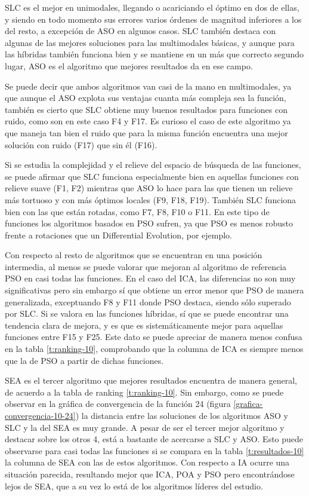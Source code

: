 SLC es el mejor en unimodales, llegando o acariciando el óptimo en dos de ellas, y siendo en todo momento sus errores varios órdenes de magnitud inferiores a los del resto, a excepción de ASO en algunos casos. SLC también destaca con algunas de las mejores soluciones para las multimodales básicas, y aunque para las híbridas también funciona bien y se mantiene en un más que correcto segundo lugar, ASO es el algoritmo que mejores resultados da en ese campo.

Se puede decir que ambos algoritmos van casi de la mano en multimodales, ya que aunque el ASO explota sus ventajas cuanta más compleja sea la función, también es cierto que SLC obtiene muy buenos resultados para funciones con ruido, como son en este caso F4 y F17. Es curioso el caso de este algoritmo ya que maneja tan bien el ruido que para la misma función encuentra una mejor solución con ruido (F17) que sin él (F16).

Si se estudia la complejidad y el relieve del espacio de búsqueda de las funciones, se puede afirmar que SLC funciona especialmente bien en aquellas funciones con relieve suave (F1, F2) mientras que ASO lo hace para las que tienen un relieve más tortuoso y con más óptimos locales (F9, F18, F19). También SLC funciona bien con las que están rotadas, como F7, F8, F10 o F11. En este tipo de funciones los algoritmos basados en PSO sufren, ya que PSO es menos robusto frente a rotaciones que un Differential Evolution, por ejemplo.

Con respecto al resto de algoritmos que se encuentran en una posición intermedia, al menos se puede valorar que mejoran al algoritmo de referencia PSO en casi todas las funciones. En el caso del ICA, las diferencias no son muy significativas pero sin embargo sí que obtiene un error menor que PSO de manera generalizada, exceptuando F8 y F11 donde PSO destaca, siendo sólo superado por SLC. Si se valora en las funciones híbridas, sí que se puede encontrar una tendencia clara de mejora, y es que es sistemáticamente mejor para aquellas funciones entre F15 y F25. Este dato se puede apreciar de manera menos confusa en la tabla \ref{t:ranking-10}, comprobando que la columna de ICA es siempre menos que la de PSO a partir de dichas funciones.

SEA es el tercer algoritmo que mejores resultados encuentra de manera general, de acuerdo a la tabla de ranking \ref{t:ranking-10}. Sin embargo, como se puede observar en la gráfica de convergencia de la función 24 (figura \ref{grafica-convergencia-10-24}) la distancia entre las soluciones de los algoritmos ASO y SLC y la del SEA es muy grande. A pesar de ser el tercer mejor algoritmo y destacar sobre los otros 4, está a bastante de acercarse a SLC y ASO. Esto puede observarse para casi todas las funciones si se compara en la tabla \ref{t:resultados-10} la columna de SEA con las de estos algoritmos. Con respecto a IA ocurre una situación parecida, resultando mejor que ICA, POA y PSO pero encontrándose lejos de SEA, que a su vez lo está de los algoritmos líderes del estudio.

